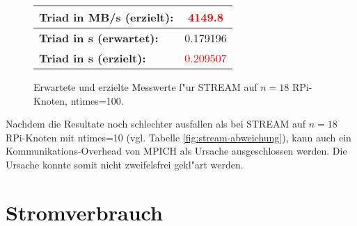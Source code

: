 \begin{enumerate}
\begin{figure}
\begin{tabular}{|l|c|}
    \hline 
    \textbf{Triad in MB/s (erzielt):} & \textcolor{red}{4149.8}\\
    \hline 
    \textbf{Triad in s (erwartet):} & 0.179196\\
    \hline 
    \textbf{Triad in s (erzielt):} & \textcolor{red}{0.209507}\\
    \hline 
  \end{tabular}
  \caption{Erwartete und erzielte Messwerte f"ur STREAM auf $n=18$ RPi-Knoten, ntimes=100.}\label{fig:stream-ntimes100}
\end{figure}
\noindent
Nachdem die Resultate noch schlechter ausfallen als bei STREAM auf $n=18$ RPi-Knoten mit ntimes=10 (vgl. Tabelle \ref{fig:stream-abweichung}), kann auch ein Kommunikations-Overhead von MPICH als Ursache ausgeschlossen werden. Die Ursache konnte somit nicht zweifelsfrei gekl"art werden. 
\end{enumerate}

\section{Stromverbrauch}

\endinput 